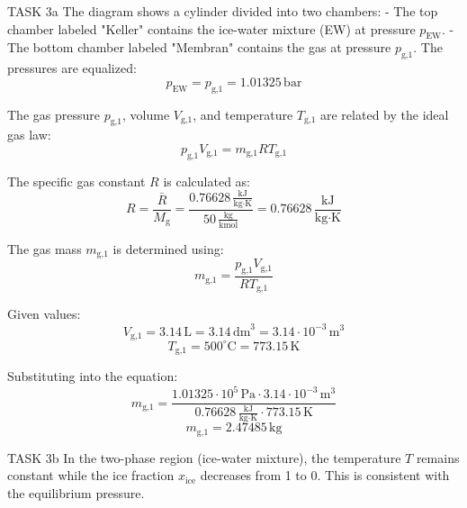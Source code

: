 TASK 3a  
The diagram shows a cylinder divided into two chambers:  
- The top chamber labeled "Keller" contains the ice-water mixture (EW) at pressure \( p_{\text{EW}} \).  
- The bottom chamber labeled "Membran" contains the gas at pressure \( p_{\text{g,1}} \).  
The pressures are equalized:  
\[
p_{\text{EW}} = p_{\text{g,1}} = 1.01325 \, \text{bar}
\]

The gas pressure \( p_{\text{g,1}} \), volume \( V_{\text{g,1}} \), and temperature \( T_{\text{g,1}} \) are related by the ideal gas law:  
\[
p_{\text{g,1}} V_{\text{g,1}} = m_{\text{g,1}} R T_{\text{g,1}}
\]

The specific gas constant \( R \) is calculated as:  
\[
R = \frac{\bar{R}}{M_{\text{g}}} = \frac{0.76628 \, \frac{\text{kJ}}{\text{kg·K}}}{50 \, \frac{\text{kg}}{\text{kmol}}} = 0.76628 \, \frac{\text{kJ}}{\text{kg·K}}
\]

The gas mass \( m_{\text{g,1}} \) is determined using:  
\[
m_{\text{g,1}} = \frac{p_{\text{g,1}} V_{\text{g,1}}}{R T_{\text{g,1}}}
\]

Given values:  
\[
V_{\text{g,1}} = 3.14 \, \text{L} = 3.14 \, \text{dm}^3 = 3.14 \cdot 10^{-3} \, \text{m}^3
\]  
\[
T_{\text{g,1}} = 500^\circ\text{C} = 773.15 \, \text{K}
\]

Substituting into the equation:  
\[
m_{\text{g,1}} = \frac{1.01325 \cdot 10^5 \, \text{Pa} \cdot 3.14 \cdot 10^{-3} \, \text{m}^3}{0.76628 \, \frac{\text{kJ}}{\text{kg·K}} \cdot 773.15 \, \text{K}}
\]  
\[
m_{\text{g,1}} = 2.47485 \, \text{kg}
\]

TASK 3b  
In the two-phase region (ice-water mixture), the temperature \( T \) remains constant while the ice fraction \( x_{\text{ice}} \) decreases from 1 to 0. This is consistent with the equilibrium pressure.